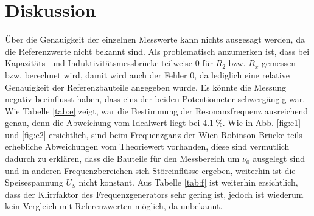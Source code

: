 \section{Diskussion}
\label{sec:Diskussion}

Über die Genauigkeit der einzelnen Messwerte kann nichts ausgesagt werden, da die Referenzwerte nicht bekannt sind. Als problematisch anzumerken ist, dass bei Kapazitäts- und Induktivitätsmessbrücke teilweise $0$ für $R_2$ bzw. $R_x$ gemessen bzw. berechnet wird, damit wird auch der Fehler $0$, da lediglich eine relative Genauigkeit der Referenzbauteile angegeben wurde. Es könnte die Messung negativ beeinflusst haben, dass eins der beiden Potentiometer schwergängig war. Wie Tabelle \ref{tab:e} zeigt, war die Bestimmung der Resonanzfrequenz ausreichend genau, denn die Abweichung vom Idealwert liegt bei $\SI{4.1}{\%}$. Wie in Abb. \ref{fig:e1} und \ref{fig:e2} ersichtlich, sind beim Frequenzganz der Wien-Robinson-Brücke teils erhebliche Abweichungen vom Theoriewert vorhanden, diese sind vermutlich dadurch zu erklären, dass die Bauteile für den Messbereich um $\nu_0$ ausgelegt sind und in anderen Frequenzbereichen sich Störeinflüsse ergeben, weiterhin ist die Speisespannung $U_S$ nicht konstant. Aus Tabelle \ref{tab:f} ist weiterhin ersichtlich, dass der Klirrfaktor des Frequenzgenerators sehr gering ist, jedoch ist wiederum kein Vergleich mit Referenzwerten möglich, da unbekannt.
